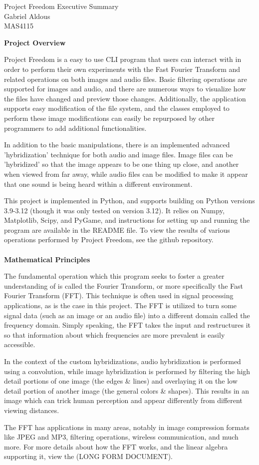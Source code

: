 \documentclass[notitlepage]{article}
\begin{document}

\begin{center}
	Project Freedom Executive Summary
	\\
	Gabriel Aldous
	\\
	MAS4115
\end{center}
\textbf{Project Overview}

Project Freedom is a easy to use CLI program that
users can interact with in order to perform their own experiments
with the Fast Fourier Transform and related operations on both images and audio files.
Basic filtering operations are supported for images and audio, and
there are numerous ways to visualize how the files have changed
and preview those changes. Additionally, the application supports
easy modification of the file system, and the classes employed
to perform these image modifications can easily be repurposed by
other programmers to add additional functionalities.

In addition to the basic manipulations, there is an implemented
advanced 'hybridization' technique for both audio and image files.
Image files can be 'hybridized' so that the image appears to be one
thing up close, and another when viewed from far away, while audio
files can be modified to make it appear that one sound is being heard
within a different environment.

This project is implemented in Python, and supports building on
Python versions 3.9-3.12 (though it was only tested on version 3.12).
It relies on Numpy, Matplotlib, Scipy, and PyGame, and instructions for
setting up and running the program are available in the README file.
To view the results of various operations performed by Project Freedom,
see the github repository.
\\\\
\textbf{Mathematical Principles}

The fundamental operation which this program seeks to
foster a greater understanding of is called the Fourier
Transform, or more specifically the Fast Fourier Transform (FFT).
This technique is often used in signal processing applications,
as is the case in this project. The FFT is utilized to turn some
signal data (such as an image or an audio file) into a different domain
called the frequency domain. Simply speaking, the FFT takes the input and
restructures it so that information about which frequencies are more prevalent
is easily accessible.

In the context of the custom hybridizations, audio hybridization is performed using
a convolution, while image hybridization is performed by filtering the high detail portions
of one image (the edges \& lines) and overlaying it on the low detail portion of another
image (the general colors \& shapes). This results in an image which can trick human perception
and appear differently from different viewing distances.

The FFT has applications in many areas, notably in image compression formats
like JPEG and MP3, filtering operations, wireless communication, and much more.
For more details about how the FFT works, and the linear algebra supporting it,
view the (LONG FORM DOCUMENT).
\end{document}

